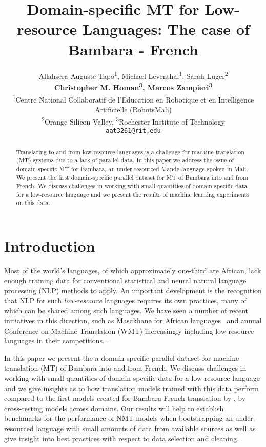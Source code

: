 \documentclass[11pt,a4paper]{article}
\title{Domain-specific MT for Low-resource Languages: The case of Bambara - French}
\author{Allahsera Auguste Tapo\textsuperscript{1}, Michael Leventhal\textsuperscript{1}, Sarah Luger\textsuperscript{2} \\ \vspace{2mm}
{\bf Christopher M. Homan\textsuperscript{3}, Marcos Zampieri\textsuperscript{3}} \\

  \textsuperscript{1}Centre National Collaboratif de l’Education en Robotique et en Intelligence Artificielle (RobotsMali)\\
  \textsuperscript{2}Orange Silicon Valley,  \textsuperscript{3}Rochester Institute of Technology \\
  \texttt{aat3261@rit.edu} \\
  }
\date{}
\begin{document}
\maketitle
\begin{abstract}

Translating to and from low-resource languages is a challenge for machine translation (MT) systems due to a lack of parallel data. In this paper we address the issue of domain-specific MT for Bambara, an under-resourced Mande language spoken in Mali. We present the first domain-specific parallel dataset for MT of Bambara into and from French. We discuss challenges in working with small quantities of domain-specific data for a low-resource language and we present the results of machine learning experiments on this data.

\end{abstract}

\section{Introduction}

Most of the world's languages, of which approximately one-third are African, lack enough training data for conventional statistical and neural natural language processing (NLP) methods to apply.
An important development is the recognition that  NLP for such \emph{low-resource} languages requires its own practices, many of which can be shared among such languages. We have seen a number of recent initiatives in  this direction, such as Masakhane for African languages~\cite{masakhane} and annual Conference on Machine Translation (WMT) increasingly including low-resource languages in their competitions.
\cite{barrault2019findings,barrault2020findings}. 

In this paper we  present the a domain-specific parallel dataset for machine translation (MT) of Bambara into and from French. We discuss challenges in working with small quantities of domain-specific data for a low-resource language and we give insights as to how translation models trained with this data perform compared to the first models created for Bambara-French translation by \citet{tapo-etal-2020-neural}, by cross-testing models across domains. Our results will help to establish benchmarks for the performance of NMT models when bootstrapping an under-resourced language with small amounts of data from available sources as well as give insight into best practices with respect to data selection and cleaning.
\end{document}

